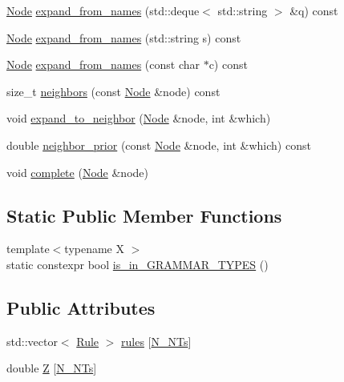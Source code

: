 \begin{DoxyCompactItemize}
\hyperlink{class_node}{Node} \hyperlink{class_grammar_aef582b15696b97c3376cba935a76acef}{expand\+\_\+from\+\_\+names} (std\+::deque$<$ std\+::string $>$ \&q) const
\item 
\hyperlink{class_node}{Node} \hyperlink{class_grammar_a53a651b1fb2cad39efc4717b635b922e}{expand\+\_\+from\+\_\+names} (std\+::string s) const
\item 
\hyperlink{class_node}{Node} \hyperlink{class_grammar_af4f8e4c2b0ad93970e579ea56c2fde60}{expand\+\_\+from\+\_\+names} (const char $\ast$c) const
\item 
size\+\_\+t \hyperlink{class_grammar_a486cec3b8e6c757eb348031ff8118a99}{neighbors} (const \hyperlink{class_node}{Node} \&node) const
\item 
void \hyperlink{class_grammar_a0765273e6b0957410447ad5d74e424bf}{expand\+\_\+to\+\_\+neighbor} (\hyperlink{class_node}{Node} \&node, int \&which)
\item 
double \hyperlink{class_grammar_a36e6e5072b99611de47c4be3ab78761c}{neighbor\+\_\+prior} (const \hyperlink{class_node}{Node} \&node, int \&which) const
\item 
void \hyperlink{class_grammar_a51a44e86d41c6e8a8ff7665208ac55da}{complete} (\hyperlink{class_node}{Node} \&node)
\end{DoxyCompactItemize}
\subsection*{Static Public Member Functions}
\begin{DoxyCompactItemize}
\item 
{\footnotesize template$<$typename X $>$ }\\static constexpr bool \hyperlink{class_grammar_a9ec7418e0263e2ade2340e248c04275d}{is\+\_\+in\+\_\+\+G\+R\+A\+M\+M\+A\+R\+\_\+\+T\+Y\+P\+ES} ()
\end{DoxyCompactItemize}
\subsection*{Public Attributes}
\begin{DoxyCompactItemize}
\item 
std\+::vector$<$ \hyperlink{class_rule}{Rule} $>$ \hyperlink{class_grammar_a8a89ced0753d72f52ccf2b04c0ccc82b}{rules} \mbox{[}\hyperlink{class_grammar_a45877d4d7a5ee98bf6753af593d6ca08}{N\+\_\+\+N\+Ts}\mbox{]}
\item 
double \hyperlink{class_grammar_a63420ee4232c46523a46bd881cb3e2f5}{Z} \mbox{[}\hyperlink{class_grammar_a45877d4d7a5ee98bf6753af593d6ca08}{N\+\_\+\+N\+Ts}\mbox{]}
\end{DoxyCompactItemize}
